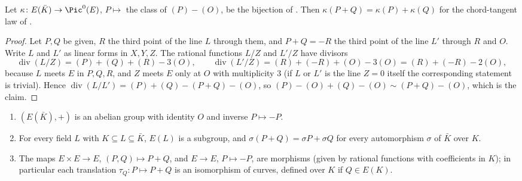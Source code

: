 \begin{proposition}\label{prop:ellcurves:pic0}
Let $\kappa\colon E(\bar K)\to\Pic^0(E)$, $P\mapsto$ the class of $(P)-(O)$, be the bijection of . Then $\kappa(P+Q)=\kappa(P)+\kappa(Q)$ for
the chord-tangent law of .
\end{proposition}

\begin{proof}
Let $P,Q$ be given, $R$ the third point of the line $L$ through them, and $P+Q=-R$ the third point of the line $L'$ through $R$ and $O$. Write $L$ and
$L'$ as linear forms in $X,Y,Z$. The rational functions $L/Z$ and $L'/Z$ have divisors
\[
\operatorname{div}(L/Z)=(P)+(Q)+(R)-3(O),\qquad\operatorname{div}(L'/Z)=(R)+(-R)+(O)-3(O)=(R)+(-R)-2(O),
\]
because $L$ meets $E$ in $P,Q,R$, and $Z$ meets $E$ only at $O$ with multiplicity $3$ (if $L$ or $L'$ is the line $Z=0$ itself the corresponding
statement is trivial). Hence $\operatorname{div}(L/L')=(P)+(Q)-(P+Q)-(O)$, so $(P)-(O)+(Q)-(O)\sim(P+Q)-(O)$, which is the claim.
\end{proof}

\begin{theorem}\label{thm:ellcurves:grouplaw}
\leavevmode
\begin{enumerate}[label=(\roman*)]
\item $(E(\bar K),+)$ is an abelian group with identity $O$ and inverse $P\mapsto-P$.
\item For every field $L$ with $K\subseteq L\subseteq\bar K$, $E(L)$ is a subgroup, and $\sigma(P+Q)=\sigma P+\sigma Q$ for every automorphism $\sigma$ of $\bar K$
over $K$.
\item The maps $E\times E\to E$, $(P,Q)\mapsto P+Q$, and $E\to E$, $P\mapsto-P$, are morphisms (given by rational functions with coefficients in
$K$); in particular each translation $\tau_Q\colon P\mapsto P+Q$ is an isomorphism of curves, defined over $K$ if $Q\in E(K)$.
\end{enumerate}
\end{theorem}

